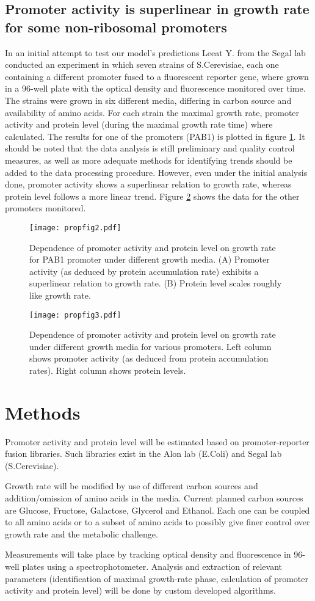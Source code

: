 \documentclass[a4page]{report}
\begin{document}
\subsection{Promoter activity is superlinear in growth rate for some non-ribosomal promoters}
In an initial attempt to test our model's predictions Leeat Y. from the Segal lab conducted an experiment in which seven strains of S.Cerevisiae, each one containing a different promoter fused to a fluorescent reporter gene, where grown in a 96-well plate with the optical density and fluorescence monitored over time.
The strains were grown in six different media, differing in carbon source and availability of amino acids.
For each strain the maximal growth rate, promoter activity and protein level (during the maximal growth rate time) where calculated.
The results for one of the promoters (PAB1) is plotted in figure \ref{gr-fl-fig}.
It should be noted that the data analysis is still preliminary and quality control measures, as well as more adequate methods for identifying trends should be added to the data processing procedure.
However, even under the initial analysis done, promoter activity shows a superlinear relation to growth rate, whereas protein level follows a more linear trend.
Figure \ref{gr-fl-mult} shows the data for the other promoters monitored.
\begin{figure}[h]
\texttt{[image: propfig2.pdf]}
\caption{Dependence of promoter activity and protein level on growth rate for PAB1 promoter under different growth media.
(A) Promoter activity (as deduced by protein accumulation rate) exhibits a superlinear relation to growth rate.
(B) Protein level scales roughly like growth rate.
}
\label{gr-fl-fig}
\end{figure}
\begin{figure}[h]
\texttt{[image: propfig3.pdf]}
\caption{Dependence of promoter activity and protein level on growth rate under different growth media for various promoters.
Left column shows promoter activity (as deduced from protein accumulation rates).
Right column shows protein levels.
}
\label{gr-fl-mult}
\end{figure}
\section{Methods}
Promoter activity and protein level will be estimated based on promoter-reporter fusion libraries.
Such libraries exist in the Alon lab (E.Coli) and Segal lab (S.Cerevisiae).

Growth rate will be modified by use of different carbon sources and addition/omission of amino acids in the media.
Current planned carbon sources are Glucose, Fructose, Galactose, Glycerol and Ethanol.
Each one can be coupled to all amino acids or to a subset of amino acids to possibly give finer control over growth rate and the metabolic challenge.

Measurements will take place by tracking optical density and fluorescence in 96-well plates using a spectrophotometer.
Analysis and extraction of relevant parameters (identification of maximal growth-rate phase, calculation of promoter activity and protein level) will be done by custom developed algorithms.


\end{document}
